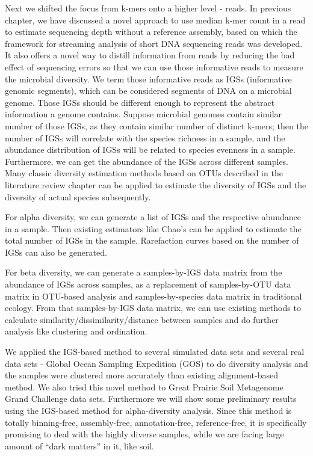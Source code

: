 \documentclass{article}
\begin{document}
Next we shifted the focus from k-mers onto a higher level - reads. 
In previous chapter, we have discussed a novel approach to use median k-mer 
count in a read to estimate
sequencing depth without a reference assembly, based on which the framework for
streaming analysis of short DNA sequencing reads was developed.
It also offers a novel way to distill information from reads by reducing the
 bad effect of sequencing errors so that we can use those informative reads to 
measure the microbial diversity. We term those informative reads as 
IGSs (informative genomic segments), which can be considered segments of DNA 
on a microbial genome. Those IGSs should be different enough to represent the 
abstract information a genome contains. Suppose microbial genomes contain 
similar number of those IGSs, as they contain similar number of distinct 
k-mers; then the number of IGSs will correlate with the species richness in a 
sample, and the abundance distribution of IGSs will be related to species 
evenness in a sample. Furthermore, we can get the abundance of the IGSs across
different samples. Many classic diversity estimation methods based on OTUs 
 described in the literature review chapter can be applied to estimate 
 the diversity of IGSs 
and the diversity of actual species subsequently.


For alpha diversity, we can generate a list of IGSs and the respective 
abundance in a sample. Then existing estimators like Chao's can be applied to 
estimate the total number of IGSs in the sample. Rarefaction curves based on the
number of IGSs can also be generated. 

For beta diversity, we can generate a samples-by-IGS data matrix from the
abundance of IGSs across samples, as a replacement of samples-by-OTU data 
matrix in OTU-based analysis and samples-by-species data matrix in traditional 
ecology. From that samples-by-IGS data matrix, we can use existing methods to 
calculate similarity/dissimilarity/distance between samples and do further 
analysis like clustering and ordination. 


We applied the IGS-based method to 
several simulated data sets and several real data sets - Global Ocean Sampling 
Expedition (GOS) to do diversity analysis and the samples were clustered 
more accurately than existing alignment-based method. We also tried this novel 
method to Great Prairie Soil Metagenome Grand Challenge data sets. Furthermore 
we will show some preliminary results using the IGS-based method for 
alpha-diversity analysis. Since this method is totally binning-free, 
assembly-free, annotation-free, reference-free, it is specifically promising 
to deal with the highly diverse samples, while we are facing large amount of 
“dark matters” in it, like soil.
\end{document}
